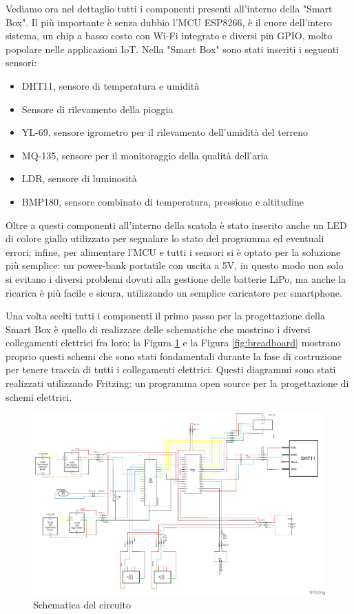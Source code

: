 \documentclass[a4paper, 12pt]{report}
\begin{document}
Vediamo ora nel dettaglio tutti i componenti presenti all'interno della "Smart Box". Il più importante è senza dubbio l'MCU ESP8266, è il cuore dell'intero sistema, un chip a basso costo con Wi-Fi integrato e diversi pin
GPIO, molto popolare nelle applicazioni IoT.
Nella "Smart Box" sono stati inseriti i seguenti sensori:

\begin{itemize}
\item DHT11, sensore di temperatura e umidità
\item Sensore di rilevamento della pioggia 
\item YL-69, sensore igrometro per il rilevamento dell'umidità del terreno
\item MQ-135, sensore per il monitoraggio della qualità dell'aria
\item LDR, sensore di luminosità 
\item BMP180, sensore combinato di temperatura, pressione e altitudine
\end{itemize}

Oltre a questi componenti all'interno della scatola è stato inserito anche un LED di colore giallo utilizzato per segnalare lo stato del programma ed eventuali errori; infine, per alimentare l'MCU e tutti i sensori si 
è optato per la soluzione più semplice: un power-bank portatile con uscita a 5V, in questo modo non solo si evitano i diversi problemi dovuti alla gestione delle batterie LiPo, ma anche la ricarica è più 
facile e sicura, utilizzando un semplice caricatore per smartphone.

Una volta scelti tutti i componenti il primo passo per la progettazione della Smart Box è quello di realizzare delle schematiche che mostrino i diversi collegamenti elettrici fra loro; la Figura \ref{fig:schematics} 
e la Figura \ref{fig:breadboard} mostrano proprio questi schemi che sono stati fondamentali durante la fase di costruzione per tenere traccia di tutti i collegamenti elettrici. Questi diagrammi sono stati realizzati 
utilizzando Fritzing\cite{fritzing}: un programma open source per la progettazione di schemi elettrici.

\begin{figure}[htbp]
\centering
\includegraphics[scale=0.4]{hardware/iot_project_schem.png}
\caption{Schematica del circuito}
\label{fig:schematics}
\end{figure}
\end{document}
